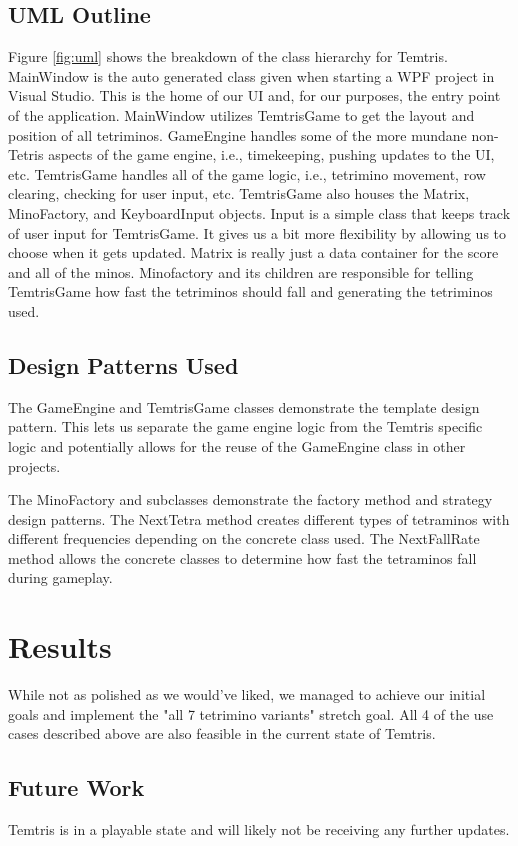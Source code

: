 \documentclass[10pt,conference,onecolumn,compsoc]{IEEEtran}
\begin{document}
\subsection{UML Outline}
Figure \ref{fig:uml} shows the breakdown of the class hierarchy for Temtris. MainWindow is the auto generated class given when starting a WPF project in Visual Studio. This is the home of our UI and, for our purposes, the entry point of the application. MainWindow utilizes TemtrisGame to get the layout and position of all tetriminos. GameEngine handles some of the more mundane non-Tetris aspects of the game engine, i.e., timekeeping, pushing updates to the UI, etc. TemtrisGame handles all of the game logic, i.e., tetrimino movement, row clearing, checking for user input, etc. TemtrisGame also houses the Matrix, MinoFactory, and KeyboardInput objects. Input is a simple class that keeps track of user input for TemtrisGame. It gives us a bit more flexibility by allowing us to choose when it gets updated. Matrix is really just a data container for the score and all of the minos. Minofactory and its children are responsible for telling TemtrisGame how fast the tetriminos should fall and generating the tetriminos used.

\subsection{Design Patterns Used}
The GameEngine and TemtrisGame classes demonstrate the template design pattern. This lets us separate the game engine logic from the Temtris specific logic and potentially allows for the reuse of the GameEngine class in other projects.

The MinoFactory and subclasses demonstrate the factory method and strategy design patterns. The NextTetra method creates different types of tetraminos with different frequencies depending on the concrete class used. The NextFallRate method allows the concrete classes to determine how fast the tetraminos fall during gameplay.


\section{Results}
While not as polished as we would've liked, we managed to achieve our initial goals and implement the "all 7 tetrimino variants" stretch goal. All 4 of the use cases described above are also feasible in the current state of Temtris.

\subsection{Future Work}
Temtris is in a playable state and will likely not be receiving any further updates.
\end{document}
